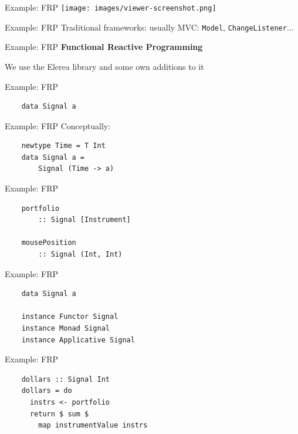 \documentclass[20pt]{beamer}
\newcommand{\vspaced}{
    \vspace{5mm}
}
\begin{document}
\begin{frame}{Example: FRP}
    \texttt{[image: images/viewer-screenshot.png]}
\end{frame}

\begin{frame}{Example: FRP}
    Traditional frameworks: usually MVC: \texttt{Model},
    \texttt{ChangeListener}...
\end{frame}

\begin{frame}{Example: FRP}
    \textbf{Functional Reactive Programming} \\
    \vspaced
    We use the Elerea library and some own additions to it
\end{frame}

\begin{frame}[fragile]{Example: FRP}
    \begin{lstlisting}
    data Signal a
    \end{lstlisting}
\end{frame}

\begin{frame}[fragile]{Example: FRP}
    Conceptually: \\
    \vspaced
    \begin{lstlisting}
    newtype Time = T Int
    data Signal a =
        Signal (Time -> a)
    \end{lstlisting}
\end{frame}

\begin{frame}[fragile]{Example: FRP}
    \begin{lstlisting}
    portfolio
        :: Signal [Instrument]

    mousePosition
        :: Signal (Int, Int)
    \end{lstlisting}
\end{frame}

\begin{frame}[fragile]{Example: FRP}
    \begin{lstlisting}
    data Signal a

    instance Functor Signal
    instance Monad Signal
    instance Applicative Signal
    \end{lstlisting}
\end{frame}

\begin{frame}[fragile]{Example: FRP}
    \begin{lstlisting}
    dollars :: Signal Int
    dollars = do
      instrs <- portfolio
      return $ sum $
        map instrumentValue instrs
    \end{lstlisting}
\end{frame}
\end{document}
